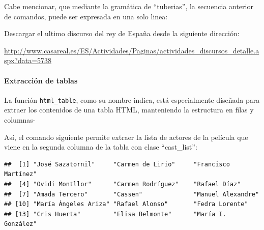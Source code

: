 \documentclass[]{article}
\newenvironment{Shaded}{\begin{snugshade}}{\end{snugshade}}
\newcommand{\KeywordTok}[1]{\textcolor[rgb]{0.13,0.29,0.53}{\textbf{#1}}}
\newcommand{\DataTypeTok}[1]{\textcolor[rgb]{0.13,0.29,0.53}{#1}}
\newcommand{\DecValTok}[1]{\textcolor[rgb]{0.00,0.00,0.81}{#1}}
\newcommand{\StringTok}[1]{\textcolor[rgb]{0.31,0.60,0.02}{#1}}
\newcommand{\CommentTok}[1]{\textcolor[rgb]{0.56,0.35,0.01}{\textit{#1}}}
\newcommand{\OtherTok}[1]{\textcolor[rgb]{0.56,0.35,0.01}{#1}}
\newcommand{\OperatorTok}[1]{\textcolor[rgb]{0.81,0.36,0.00}{\textbf{#1}}}
\newcommand{\NormalTok}[1]{#1}
\let\oldparagraph\paragraph
\renewcommand{\paragraph}[1]{\oldparagraph{#1}\mbox{}}
\newenvironment{ej}{\begin{Shaded}}{\end{Shaded}}
\begin{document}
Cabe mencionar, que mediante la gramática de ``tuberias'', la secuencia
anterior de comandos, puede ser expresada en una solo linea:

\begin{Shaded}
\end{Shaded}

\begin{ej}
Descargar el ultimo discurso del rey de España desde la siguiente
dirección:

\url{http://www.casareal.es/ES/Actividades/Paginas/actividades_discursos_detalle.aspx?data=5738}
\end{ej}

\paragraph{Extracción de tablas}\label{extraccion-de-tablas}

La función \texttt{html\_table}, como su nombre indica, está
especialmente diseñada para extraer los contenidos de una tabla HTML,
manteniendo la estructura en filas y columnas-

Así, el comando siguiente permite extraer la lista de actores de la
película que viene en la segunda columna de la tabla con clase
``cast\_list'':

\begin{Shaded}
\end{Shaded}

\begin{verbatim}
##  [1] "José Sazatornil"     "Carmen de Lirio"     "Francisco Martínez" 
##  [4] "Ovidi Montllor"      "Carmen Rodríguez"    "Rafael Díaz"        
##  [7] "Amada Tercero"       "Cassen"              "Manuel Alexandre"   
## [10] "María Ángeles Ariza" "Rafael Alonso"       "Fedra Lorente"      
## [13] "Cris Huerta"         "Elisa Belmonte"      "María I. González"
\end{verbatim}
\end{document}
